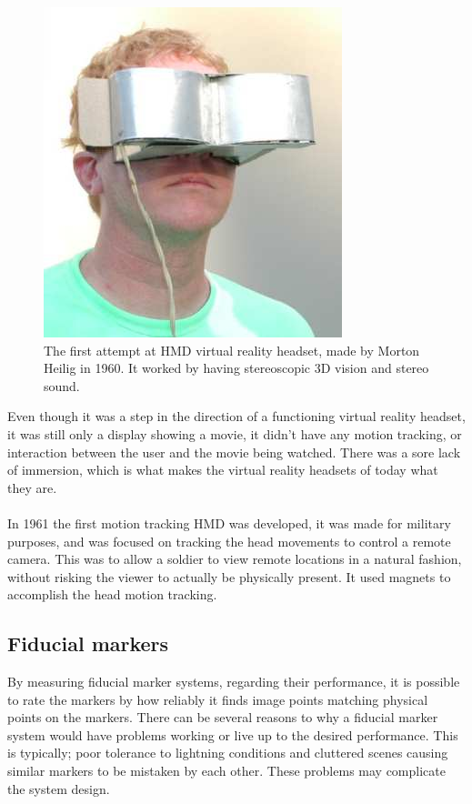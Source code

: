 			\begin{figure}[H]
				\centering
				\includegraphics[width=0.25\linewidth]{figure/Analysis/TelesphereMask}
				\caption{The first attempt at HMD virtual reality headset, made by Morton Heilig in 1960. It worked by having stereoscopic 3D vision and stereo sound.}
				\label{fig:telesphere}
			\end{figure}
			Even though it was a step in the direction of a functioning virtual reality headset, it was still only a display showing a movie, it didn't have any motion tracking, or interaction between the user and the movie being watched. There was a sore lack of immersion, which is what makes the virtual reality headsets of today what they are.\\\\

			In 1961 the first motion tracking HMD was developed\cite{VRS}, it was made for military purposes, and was focused on tracking the head movements to control a remote camera. This was to allow a soldier to view remote locations in a natural fashion, without risking the viewer to actually be physically present. It used magnets to accomplish the head motion tracking.

			
			\subsection{Fiducial markers}
				By measuring fiducial marker systems, regarding their performance, it is possible to rate the markers by how reliably it finds image points matching physical points on the markers. There can be several reasons to why a fiducial marker system would have problems working or live up to the desired performance. This is typically; poor tolerance to lightning conditions and cluttered scenes causing similar markers to be mistaken by each other\cite{fiducialMarkers}. These problems may complicate the system design.\\
				
